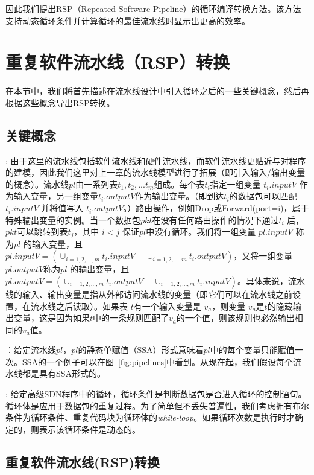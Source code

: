因此我们提出RSP（Repeated Software Pipeline）的循环编译转换方法。该方法支持动态循环条件并计算循环的最佳流水线时显示出更高的效率。




\section{重复软件流水线（RSP）转换}
\label{sec:model}

在本节中，我们将首先描述在流水线设计中引入循环之后的一些关键概念，然后再根据这些概念导出RSP转换。
\subsection{关键概念}
: 由于这里的流水线包括软件流水线和硬件流水线，而软件流水线更贴近与对程序的建模，因此我们这里对上一章的流水线模型进行了拓展（即引入输入/输出变量的概念）。流水线$pl$由一系列表$t_1, t_2, ... t_m$组成。每个表$t_i$指定一组变量 $t_i.inputV$ 作为输入变量，另一组变量$t_i.outputV$作为输出变量。（即到达$t_i$的数据包可以匹配$t_i.inputV$ 并将值写入 $t_i.outputV$。）路由操作，例如Drop或Forward(port=i)，属于特殊输出变量的实例。当一个数据包$pkt$在没有任何路由操作的情况下通过$t_i$ 后，$pkt$可以跳转到表$t_j$，其中 $i < j$ 保证$pl$中没有循环。我们将一组变量 $pl.inputV$ 称为$pl$ 的输入变量，且$pl.inputV = (\cup_{i = 1, 2, ..., m}t_i.inputV - \cup_{i = 1, 2, ..., m}t_i.outputV)$，又将一组变量 $pl.outputV$称为$pl$ 的输出变量，且$pl.outputV = (\cup_{i = 1, 2, ..., m}t_i.outputV - \cup_{i = 1, 2, ..., m}t_i.inputV)$。具体来说，流水线的输入、输出变量是指从外部访问流水线的变量（即它们可以在流水线之前设置，在流水线之后读取）。如果表 $t$有一个输入变量是 $v_a$，则变量 $v_a$是$t$的隐藏输出变量，这是因为如果$t$中的一条规则匹配了$v_a$的一个值，则该规则也必然输出相同的$v_a$值。 

：给定流水线$pl$，$pl$的静态单赋值（SSA）形式意味着$pl$中的每个变量只能赋值一次。SSA的一个例子可以在图~\ref{fig:pipelines}中看到。从现在起，我们假设每个流水线都是具有SSA形式的。

: 给定高级SDN程序中的循环，循环条件是判断数据包是否进入循环的控制语句。循环体是应用于数据包的重复过程。为了简单但不丢失普遍性，我们考虑拥有布尔条件为循环条件、重复代码块为循环体的\emph{while-loop}。如果循环次数是执行时才确定的，则表示该循环条件是动态的。

\subsection{重复软件流水线(RSP)转换}

